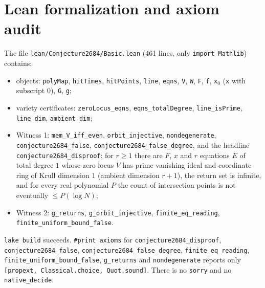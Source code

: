 \documentclass[11pt]{article}
\theoremstyle{definition}
\theoremstyle{remark}
\begin{document}
\section{Lean formalization and axiom audit}

The file \texttt{lean/Conjecture2684/Basic.lean} (461 lines, only \texttt{import Mathlib}) contains:
\begin{itemize}
\item objects: \texttt{polyMap}, \texttt{hitTimes}, \texttt{hitPoints}, \texttt{line}, \texttt{eqns},
  \texttt{V}, \texttt{W}, \texttt{F}, \texttt{f}, \texttt{x}$_0$ (\texttt{x} with subscript 0), \texttt{G}, \texttt{g};
\item variety certificates: \texttt{zeroLocus\_eqns}, \texttt{eqns\_totalDegree},
  \texttt{line\_isPrime}, \texttt{line\_dim}, \texttt{ambient\_dim};
\item Witness 1: \texttt{mem\_V\_iff\_even}, \texttt{orbit\_injective}, \texttt{nondegenerate},
  \texttt{conjecture2684\_false}, \texttt{conjecture2684\_false\_degree}, and the headline
  \texttt{conjecture2684\_disproof}: for $r\ge1$ there are $F$, $x$ and $r$ equations $E$ of total
  degree $1$ whose zero locus $V$ has prime vanishing ideal and coordinate ring of Krull dimension
  $1$ (ambient dimension $r+1$), the return set is infinite, and for every real polynomial $P$ the
  count of intersection points is not eventually $\le P(\log N)$;
\item Witness 2: \texttt{g\_returns}, \texttt{g\_orbit\_injective}, \texttt{finite\_eq\_reading},
  \texttt{finite\_uniform\_bound\_false}.
\end{itemize}
\texttt{lake build} succeeds. \texttt{\#print axioms} for \texttt{conjecture2684\_disproof},
\texttt{conjecture2684\_false}, \texttt{conjecture2684\_false\_degree}, \texttt{finite\_eq\_reading},
\texttt{finite\_uniform\_bound\_false}, \texttt{g\_returns} and \texttt{nondegenerate} reports only
\texttt{[propext, Classical.choice, Quot.sound]}. There is no \texttt{sorry} and no
\texttt{native\_decide}.
\end{document}
